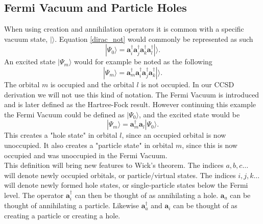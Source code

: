 \documentclass[a4paper,norsk,11pt,twoside]{report}
\begin{document}
\subsection{Fermi Vacuum and Particle Holes}

When using creation and annihilation operators it is common  with a specific vacuum state, $| \rangle$. Equation \eqref{dirac_not} would commonly be represented as such
\begin{equation}
|\Psi_0 \rangle = \textbf{a}^{\dag}_i
\textbf{a}^{\dag}_j
\textbf{a}^{\dag}_k
\textbf{a}^{\dag}_l |\rangle .
\end{equation}
An excited state $|\Psi_m\rangle$ would for example be noted as the following
\begin{equation}
|\Psi_m \rangle = \textbf{a}^{\dag}_m
\textbf{a}^{\dag}_i
\textbf{a}^{\dag}_j
\textbf{a}^{\dag}_k |\rangle .
\end{equation}
The orbital $m$ is occupied and the orbital $l$ is not occupied. In
our CCSD derivation we will not use this kind of notation. The Fermi
Vacuum is introduced and is later defined as the Hartree-Fock
result. However continuing this example the Fermi Vacuum could be
defined as $|\Psi_0\rangle$, and the excited state would be
\begin{equation}
|\Psi_m\rangle = \textbf{a}^{\dag}_m \textbf{a}_l |\Psi_0\rangle .
\end{equation}
This creates a "hole state" in orbital $l$, since an occupied orbital is now unoccupied. It also creates a "particle state" in orbital $m$, since this is now occupied and was unoccupied in the Fermi Vacuum. \\

This definition will bring new features to Wick's theorem. The indices
$a, b, c \dots$ will denote newly occupied orbitals, or
particle/virtual states. The indices $i, j, k \dots$ will denote newly
formed hole states, or single-particle states below the Fermi
level. The operator $\textbf{a}^{\dag}_i$ can then be thought of as
annihilating a hole. $\textbf{a}_a$ can be thought of annihilating a
particle. Likewise $\textbf{a}^{\dag}_a$ and $\textbf{a}_i$ can be
thought of as creating a particle or creating a hole. \\
\end{document}
